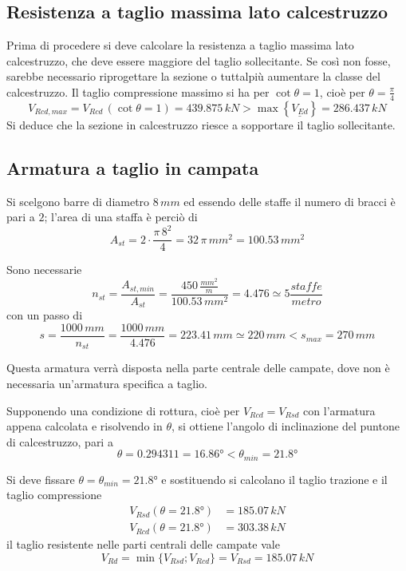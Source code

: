 \subsection{Resistenza a taglio massima lato calcestruzzo}

Prima di procedere si deve calcolare la resistenza a taglio massima lato calcestruzzo, che deve essere maggiore del taglio sollecitante. Se così non fosse, sarebbe necessario riprogettare la sezione o tuttalpiù aumentare la classe del calcestruzzo. Il taglio compressione massimo si ha per $\cot\theta = 1$, cioè per $\theta = \frac{\pi}{4}$
\[
V_{Rcd,max} = V_{Rcd}\,(\cot\theta=1) = 439.875\,kN > \max\left\{\underline{V_{Ed}}\right\} = 286.437\,kN
\]
Si deduce che la sezione in calcestruzzo riesce a sopportare il taglio sollecitante.

\subsection{Armatura a taglio in campata}

Si scelgono barre di diametro $8\,mm$ ed essendo delle staffe il numero di bracci è pari a $2$; l'area di una staffa è perciò di
\[
A_{st} = 2\cdot\dfrac{\pi\,8^2}{4} = 32\,\pi\,mm^2 = 100.53\,mm^2
\]

Sono necessarie 
\[
n_{st} = \dfrac{A_{st,min}}{A_{st}} = \dfrac{450\,\frac{mm^2}{m}}{100.53\,mm^2} = 4.476\simeq 5 \dfrac{staffe}{metro}
\]
con un passo di 
\[
s = \dfrac{1000\,mm}{n_{st}} = \dfrac{1000\,mm}{4.476} = 223.41\,mm \simeq 220\,mm < s_{max} = 270\,mm
\]

Questa armatura verrà disposta nella parte centrale delle campate, dove non è necessaria un'armatura specifica a taglio. 

Supponendo una condizione di rottura, cioè per $V_{Rcd} = V_{Rsd}$ con l'armatura appena calcolata e risolvendo in $\theta$, si ottiene l'angolo di inclinazione del puntone di calcestruzzo, pari a
\[
\theta = 0.29431\si{1}  =  \ang{16.86} < \theta_{min} = \ang{21.8}
\]

Si deve fissare $\theta = \theta_{min} = \ang{21.8}$ e sostituendo si calcolano il taglio trazione e il taglio compressione
\begin{align*}
	V_{Rsd}(\theta = \ang{21.8}) &= 185.07\,kN\\
	V_{Rcd}(\theta = \ang{21.8}) &= 303.38\,kN
\end{align*}
il taglio resistente nelle parti centrali delle campate vale
\[
V_{Rd} = \min\{V_{Rsd}; V_{Rcd}\} = V_{Rsd} = 185.07\,kN
\]

